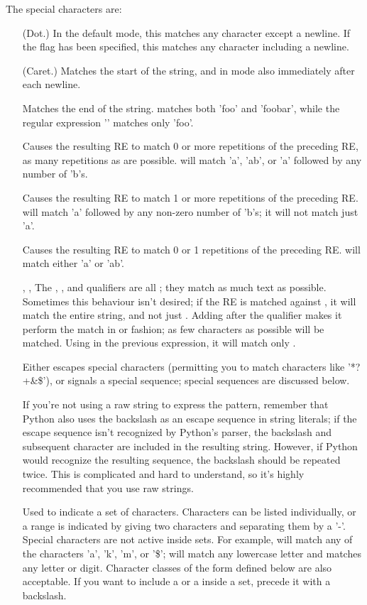 The special characters are:
\begin{itemize}
\item[\code{.}] (Dot.)  In the default mode, this matches any
character except a newline.  If the  flag has been
specified, this matches any character including a newline.
\item[\code{\^}] (Caret.)  Matches the start of the string, and in
 mode also immediately after each newline.
\item[\code{\$}] Matches the end of the string.  
 matches both 'foo' and 'foobar', while the regular
expression '' matches only 'foo'.
%
\item[\code{*}] Causes the resulting RE to
match 0 or more repetitions of the preceding RE, as many repetitions
as are possible.   will
match 'a', 'ab', or 'a' followed by any number of 'b's.
%
\item[\code{+}] Causes the
resulting RE to match 1 or more repetitions of the preceding RE.
 will match 'a' followed by any non-zero number of 'b's; it
will not match just 'a'.
%
\item[\code{?}] Causes the resulting RE to
match 0 or 1 repetitions of the preceding RE.   will
match either 'a' or 'ab'.
\item[\code{*?}, \code{+?}, \code{??}] The \code{*}, \code{+}, and
 qualifiers are all ; they match as much text as
possible.  Sometimes this behaviour isn't desired; if the RE
 is matched against , it will match the
entire string, and not just .
Adding  after the qualifier makes it perform the match in
 or  fashion; as few characters as
possible will be matched.  Using  in the previous
expression, it will match only .
%
\item[\code{\e}] Either escapes special characters (permitting you to match
characters like '*?+\&\$'), or signals a special sequence; special
sequences are discussed below.  

If you're not using a raw string to
express the pattern, remember that Python also uses the
backslash as an escape sequence in string literals; if the escape
sequence isn't recognized by Python's parser, the backslash and
subsequent character are included in the resulting string.  However,
if Python would recognize the resulting sequence, the backslash should
be repeated twice.   This is complicated and hard to understand, so
it's highly recommended that you use raw strings.
%
\item[\code{[]}] Used to indicate a set of characters.  Characters can
be listed individually, or a range is indicated by giving two
characters and separating them by a '-'.  Special characters are not
active inside sets.  For example, \code{[akm\$]} will match any of the
characters 'a', 'k', 'm', or '\$'; \code{[a-z]} will match any
lowercase letter and \code{[a-zA-Z0-9]} matches any letter or digit.
Character classes of the form  defined below are also acceptable.
If you want to include a \code{]} or a \code{-} inside a
set, precede it with a backslash. 


\end{itemize}
